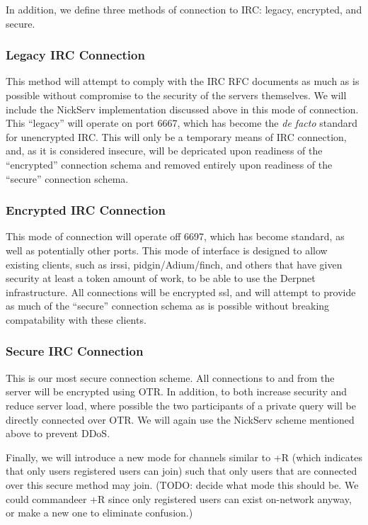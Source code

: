 \documentclass[11pt]{article}
\begin{document}
In addition, we define three methods of connection to IRC: legacy, encrypted,
and secure.

\subsubsection{Legacy IRC Connection}

This method will attempt to comply with the IRC RFC documents as much as is
possible without compromise to the security of the servers themselves.  We
will include the NickServ implementation discussed above in this mode of
connection.  This ``legacy'' will operate on port 6667, which has become the
\textit{de facto} standard for unencrypted IRC.  This will only be a temporary
means of IRC connection, and, as it is considered insecure, will be depricated
upon readiness of the ``encrypted'' connection schema and removed entirely
upon readiness of the ``secure'' connection schema.

\subsubsection{Encrypted IRC Connection}

This mode of connection will operate off 6697, which has become standard, as
well as potentially other ports.  This mode of interface is designed to allow
existing clients, such as irssi, pidgin/Adium/finch, and others that have
given security at least a token amount of work, to be able to use the Derpnet
infrastructure.  All connections will be encrypted ssl, and will attempt to
provide as much of the ``secure'' connection schema as is possible without
breaking compatability with these clients.

\subsubsection{Secure IRC Connection}

This is our most secure connection scheme.  All connections to and from the
server will be encrypted using OTR.  In addition, to both increase security
and reduce server load, where possible the two participants of a private query
will be directly connected over OTR.  We will again use the NickServ scheme
mentioned above to prevent DDoS.

Finally, we will introduce a new mode for channels similar to +R (which
indicates that only users registered users can join) such that only users that
are connected over this secure method may join.  (TODO: decide what mode this
should be.  We could commandeer +R since only registered users can exist
on-network anyway, or make a new one to eliminate confusion.)
\end{document}
